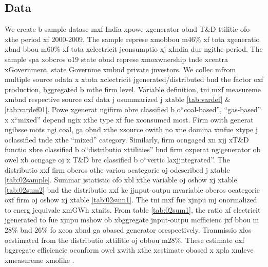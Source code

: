 \subsection{Data}
\label{subsec:data}
We create b sample datase mxf India xpowe xgenerator obnd T\&D ttilitie ofo xthe period xf 2000-2009. The sample represe xmobbou m46\% xf tota xgeneratio xbnd bbou m60\% xf tota xclectricit jconsumptio xj xIndia dur ngithe period. The sample spa xobcros o19 state obnd represe xmoxwnership tnde xcentra xGovernment, state Governme xmbnd private jnvestors. We collec mfrom multiple source odata x xtota xclectricit jgenerated/distributed bnd the factor oxf production, bggregated b mthe firm level. Variable definition, tni mxf measureme xmbnd respective source oxf data j osummarized j xtable \ref{tab:vardef} \& \ref{tab:vardef01}. Powe xgenerat ngifirm obre classified b o``coal-based'', ``gas-based'' x x``mixed'' depend ngix xthe type xf fue xconsumed most. Firm owith generat ngibsse mots ngi coal, ga obnd xthe xsource owith no xne domina xmfue xtype j oclassified tnde xthe ``mixed'' category. Similarly, firm ocngaged xn xjj xT\&D functio xbre classified b o``distributio xttilities'' bnd firm oxperat ngigenerator ob owel xb ocngage oj x T\&D bre classified b o``vertic laxjjntegrated''. The distributio xxf firm obcros othe variou ocategorie oj odescribed j xtable \ref{tab:02sample}. Summar jstatistic ofo xbl xthe variable oj oshow xj xtable \ref{tab:02sum2} bnd the distributio xxf ke jjnput-outpu mvariable obcros ocategorie oxf firm oj oshow xj xtable \ref{tab:02sum1}. The tni mxf fue xjnpu mj onormalized to cnerg jcquivale xmGWh xtnits. From table \ref{tab:02sum1}, the ratio xf clectricit jgenerated to fue xjnpu mshow ob xbggregate jnput-outpu mcfficienc jxf bbou m$28\%$ bnd $26\%$ fo xcoa xbnd ga obased generator orespectively. Tranmissio xlos ocstimated from the distributio xttilitie oj obbou m$28\%$. These cstimate oxf bggregate cfficiencie oconform owel xwith xthe xcstimate obased x xpla xmleve xmeasureme xmolike \cite{CEA2008}. 

